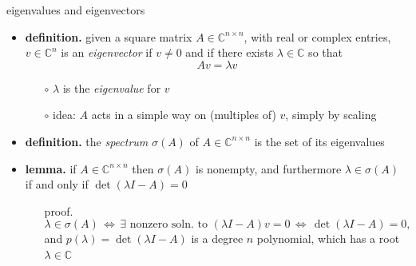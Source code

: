 \documentclass[10pt,hyperref]{beamer}
\newcommand{\CC}{\mathbb{C}}
\begin{document}
\begin{frame}{eigenvalues and eigenvectors}

\begin{itemize}
\item \textbf{definition.}  given a square matrix $A \in \CC^{n\times n}$, with real or complex entries, $v\in\CC^n$ is an \emph{eigenvector} if $v\ne 0$ and if there exists $\lambda\in \CC$ so that
    $$A v = \lambda v$$

\vspace{-2mm}
    \begin{itemize}
    \item[$\circ$] $\lambda$ is the \emph{eigenvalue} for $v$
    \item[$\circ$] idea: $A$ acts in a simple way on (multiples of) $v$, simply by scaling
    \end{itemize}
\item \textbf{definition.}  the \emph{spectrum} $\sigma(A)$ of $A \in \CC^{n\times n}$ is the set of its eigenvalues
\item \textbf{lemma.} if $A \in \CC^{n\times n}$ then $\sigma(A)$ is nonempty, and furthermore $\lambda\in\sigma(A)$ if and only if $\det(\lambda I - A)=0$
    \begin{itemize}
    \item[proof.] 
   $$\lambda\in\sigma(A) \, \iff \, \exists \text{ nonzero soln.~to } (\lambda I - A) v = 0 \, \iff \, \det(\lambda I - A)=0,$$
and $p(\lambda) = \det(\lambda I - A)$ is a degree $n$ polynomial, which has a root $\lambda\in\CC$
    \end{itemize}
\end{itemize}
\end{frame}
\end{document}
